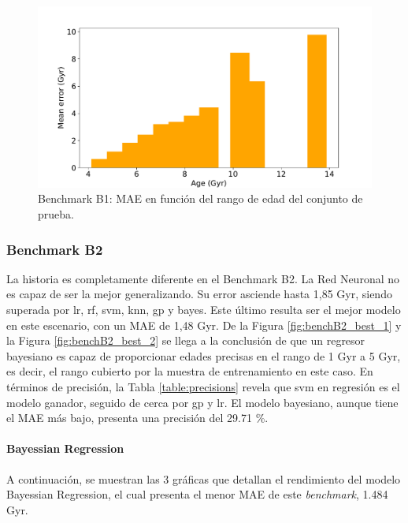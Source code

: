 \begin{figure}[H]
\begin{center}
 \includegraphics[width=0.8\linewidth]{Figuras/Experimentos/B_B1_nnet_3.pdf}
\end{center}
\caption{Benchmark B1: MAE en función del rango de edad del conjunto de prueba.}
 \label{fig:benchB1_best_3}
\end{figure}

\subsubsection{Benchmark B2} 

La historia es completamente diferente en el Benchmark B2. La Red Neuronal no es capaz de ser la mejor generalizando. Su error asciende hasta 1,85 Gyr, siendo superada por lr, rf, svm, knn, gp y bayes. Este último resulta ser el mejor modelo en este escenario, con un MAE de 1,48 Gyr. De la Figura \ref{fig:benchB2_best_1} y la Figura \ref{fig:benchB2_best_2} se llega a la conclusión de que un regresor bayesiano es capaz de proporcionar edades precisas en el rango de 1 Gyr a 5 Gyr, es decir, el rango cubierto por la muestra de entrenamiento en este caso. En términos de precisión, la Tabla \ref{table:precisions} revela que svm en regresión es el modelo ganador, seguido de cerca por gp y lr. El modelo bayesiano, aunque tiene el MAE más bajo, presenta una precisión del 29.71 \%.

\paragraph{Bayessian Regression} 
A continuación, se muestran las 3 gráficas que detallan el rendimiento del modelo Bayessian Regression, el cual presenta el menor MAE de este \emph{benchmark}, 1.484 Gyr.

